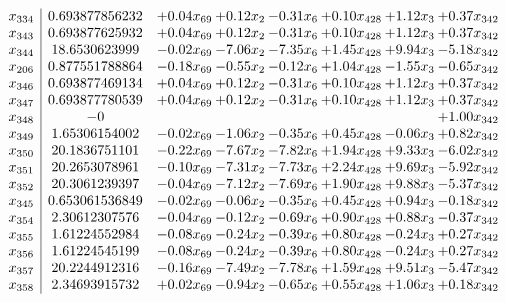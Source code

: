 \documentclass[8pt]{article}
\begin{document}
\[\begin{array}{c| c c@{\hskip 2pt} c@{\hskip 2pt} c@{\hskip 2pt} c@{\hskip 2pt} c@{\hskip 2pt} c@{\hskip 2pt} }
 x_{334}   &  0.693877856232 & +  0.04 x_{69} & +  0.12 x_{2} & -0.31 x_{6} & +  0.10 x_{428} & +  1.12 x_{3} & +  0.37 x_{342}\\
 x_{343}   &  0.693877625932 & +  0.04 x_{69} & +  0.12 x_{2} & -0.31 x_{6} & +  0.10 x_{428} & +  1.12 x_{3} & +  0.37 x_{342}\\
 x_{344}   &  18.6530623999 & -0.02 x_{69} & -7.06 x_{2} & -7.35 x_{6} & +  1.45 x_{428} & +  9.94 x_{3} & -5.18 x_{342}\\
 x_{206}   &  0.877551788864 & -0.18 x_{69} & -0.55 x_{2} & -0.12 x_{6} & +  1.04 x_{428} & -1.55 x_{3} & -0.65 x_{342}\\
 x_{346}   &  0.693877469134 & +  0.04 x_{69} & +  0.12 x_{2} & -0.31 x_{6} & +  0.10 x_{428} & +  1.12 x_{3} & +  0.37 x_{342}\\
 x_{347}   &  0.693877780539 & +  0.04 x_{69} & +  0.12 x_{2} & -0.31 x_{6} & +  0.10 x_{428} & +  1.12 x_{3} & +  0.37 x_{342}\\
 x_{348}   &  -0  &    &    &    &    &   & +  1.00 x_{342}\\
 x_{349}   &  1.65306154002 & -0.02 x_{69} & -1.06 x_{2} & -0.35 x_{6} & +  0.45 x_{428} & -0.06 x_{3} & +  0.82 x_{342}\\
 x_{350}   &  20.1836751101 & -0.22 x_{69} & -7.67 x_{2} & -7.82 x_{6} & +  1.94 x_{428} & +  9.33 x_{3} & -6.02 x_{342}\\
 x_{351}   &  20.2653078961 & -0.10 x_{69} & -7.31 x_{2} & -7.73 x_{6} & +  2.24 x_{428} & +  9.69 x_{3} & -5.92 x_{342}\\
 x_{352}   &  20.3061239397 & -0.04 x_{69} & -7.12 x_{2} & -7.69 x_{6} & +  1.90 x_{428} & +  9.88 x_{3} & -5.37 x_{342}\\
 x_{345}   &  0.653061536849 & -0.02 x_{69} & -0.06 x_{2} & -0.35 x_{6} & +  0.45 x_{428} & +  0.94 x_{3} & -0.18 x_{342}\\
 x_{354}   &  2.30612307576 & -0.04 x_{69} & -0.12 x_{2} & -0.69 x_{6} & +  0.90 x_{428} & +  0.88 x_{3} & -0.37 x_{342}\\
 x_{355}   &  1.61224552984 & -0.08 x_{69} & -0.24 x_{2} & -0.39 x_{6} & +  0.80 x_{428} & -0.24 x_{3} & +  0.27 x_{342}\\
 x_{356}   &  1.61224545199 & -0.08 x_{69} & -0.24 x_{2} & -0.39 x_{6} & +  0.80 x_{428} & -0.24 x_{3} & +  0.27 x_{342}\\
 x_{357}   &  20.2244912316 & -0.16 x_{69} & -7.49 x_{2} & -7.78 x_{6} & +  1.59 x_{428} & +  9.51 x_{3} & -5.47 x_{342}\\
 x_{358}   &  2.34693915732 & +  0.02 x_{69} & -0.94 x_{2} & -0.65 x_{6} & +  0.55 x_{428} & +  1.06 x_{3} & +  0.18 x_{342}\\

\end{array}\]
\end{document}
